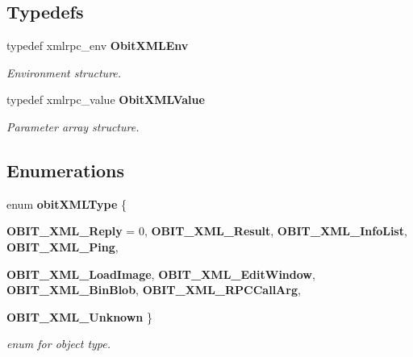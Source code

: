 \subsection*{Typedefs}
\begin{CompactItemize}
\item 
typedef xmlrpc\_\-env {\bf Obit\-XMLEnv}
\begin{CompactList}\small\item\em Environment structure. \item\end{CompactList}\item 
typedef xmlrpc\_\-value {\bf Obit\-XMLValue}
\begin{CompactList}\small\item\em Parameter array structure. \item\end{CompactList}\end{CompactItemize}
\subsection*{Enumerations}
\begin{CompactItemize}
\item 
enum {\bf obit\-XMLType} \{ \par
{\bf OBIT\_\-XML\_\-Reply} =  0, 
{\bf OBIT\_\-XML\_\-Result}, 
{\bf OBIT\_\-XML\_\-Info\-List}, 
{\bf OBIT\_\-XML\_\-Ping}, 
\par
{\bf OBIT\_\-XML\_\-Load\-Image}, 
{\bf OBIT\_\-XML\_\-Edit\-Window}, 
{\bf OBIT\_\-XML\_\-Bin\-Blob}, 
{\bf OBIT\_\-XML\_\-RPCCall\-Arg}, 
\par
{\bf OBIT\_\-XML\_\-Unknown}
 \}
\begin{CompactList}\small\item\em enum for object type. \item\end{CompactList}\end{CompactItemize}

